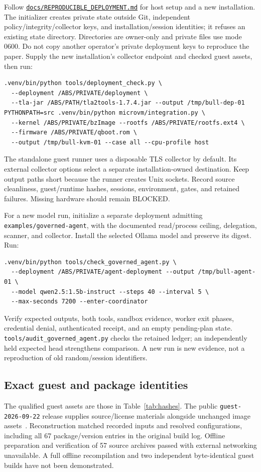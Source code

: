\documentclass[journal]{IEEEtran}
\newcommand{\code}[1]{\texttt{#1}}
\newcommand{\repo}[1]{\href{https://github.com/Anharmoniclabs/BULL/blob/ab53f563bcbcaf60820acb318b8212796ce502ff/#1}{\nolinkurl{#1}}}
\begin{document}
Follow \repo{docs/REPRODUCIBLE_DEPLOYMENT.md} for host setup and a new installation. The initializer creates private state outside Git, independent policy/integrity/collector keys, and installation/session identities; it refuses an existing state directory. Directories are owner-only and private files use mode 0600. Do not copy another operator's private deployment keys to reproduce the paper. Supply the new installation's collector endpoint and checked guest assets, then run:
\begin{lstlisting}
.venv/bin/python tools/deployment_check.py \
  --deployment /ABS/PRIVATE/deployment \
  --tla-jar /ABS/PATH/tla2tools-1.7.4.jar --output /tmp/bull-dep-01
PYTHONPATH=src .venv/bin/python microvm/integration.py \
  --kernel /ABS/PRIVATE/bzImage --rootfs /ABS/PRIVATE/rootfs.ext4 \
  --firmware /ABS/PRIVATE/qboot.rom \
  --output /tmp/bull-kvm-01 --case all --cpu-profile host
\end{lstlisting}
The standalone guest runner uses a disposable TLS collector by default. Its external collector options select a separate installation-owned destination. Keep output paths short because the runner creates Unix sockets. Record source cleanliness, guest/runtime hashes, sessions, environment, gates, and retained failures. Missing hardware should remain BLOCKED.

For a new model run, initialize a separate deployment admitting \code{examples/governed-agent}, with the documented read/process ceiling, delegation, scanner, and collector. Install the selected Ollama model and preserve its digest. Run:
\begin{lstlisting}
.venv/bin/python tools/check_governed_agent.py \
  --deployment /ABS/PRIVATE/agent-deployment --output /tmp/bull-agent-01 \
  --model qwen2.5:1.5b-instruct --steps 40 --interval 5 \
  --max-seconds 7200 --enter-coordinator
\end{lstlisting}
Verify expected outputs, both tools, sandbox evidence, worker exit phases, credential denial, authenticated receipt, and an empty pending-plan state. \code{tools/audit\_governed\_agent.py} checks the retained ledger; an independently held expected head strengthens comparison. A new run is new evidence, not a reproduction of old random/session identifiers.

\subsection{Exact guest and package identities}
The qualified guest assets are those in Table~\ref{tab:hashes}. The public \code{guest-2026-09-22} release supplies source/license materials alongside unchanged image assets~\cite{distribution}. Reconstruction matched recorded inputs and resolved configurations, including all 67 package/version entries in the original build log. Offline preparation and verification of 57 source archives passed with external networking unavailable. A full offline recompilation and two independent byte-identical guest builds have not been demonstrated.
\end{document}
